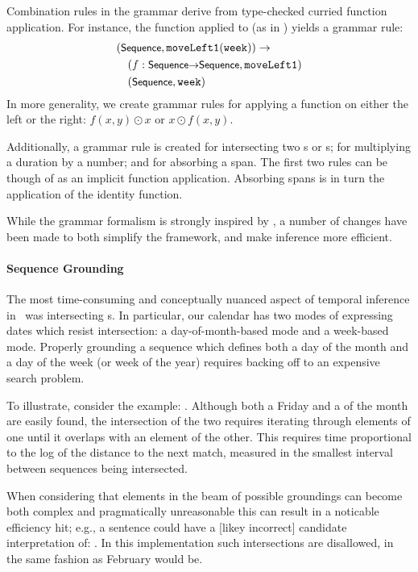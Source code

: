 Combination rules in the grammar derive from type-checked
  curried function application.
For instance, the function  applied
  to  (as in ) yields a grammar rule:
\begin{align*}
&  (\ty{Sequence}, \te{moveLeft1$($week$)$}) \rightarrow \\
&~~~(f:\ty{Sequence$\rightarrow$Sequence}, \te{moveLeft1}) \\
&~~~(\ty{Sequence}, \te{week})
\end{align*}
In more generality, we create grammar rules for applying a function
  on either the left or the right: $f(x,y) \odot x$ or $x \odot f(x,y)$.

Additionally, a grammar rule is created for intersecting two s or
  s; for multiplying a duration by a number; and for absorbing
  a  span.
The first two rules can be though of as an implicit function application.
Absorbing  spans is in turn the application of the identity function.

While the grammar formalism is strongly inspired by \me, a number of changes
  have been made to both simplify the framework, and make inference more
  efficient.

\paragraph{Sequence Grounding}
The most time-consuming and conceptually nuanced aspect of temporal inference
  in \me\ was intersecting s.
In particular, our calendar has two modes of expressing
  dates which resist intersection: a day-of-month-based mode and a
  week-based mode.
Properly grounding a sequence which defines both a day of the month and
  a day of the week (or week of the year) requires backing
  off to an expensive search problem.

To illustrate, consider the example: .
Although both a Friday and a  of the month are easily found, the
  intersection of the two requires iterating through elements of one until
  it overlaps with an element of the other.
This requires time proportional to the log of the distance to the next match,
  measured in the smallest interval between sequences being intersected.

When considering that elements in the beam of possible groundings can become
  both complex and pragmatically unreasonable this can result in a noticable
  efficiency hit; e.g., a sentence could have a
  [likey incorrect] candidate interpretation of:
  .
In this implementation such intersections are disallowed, in the same fashion
  as February  would be.

